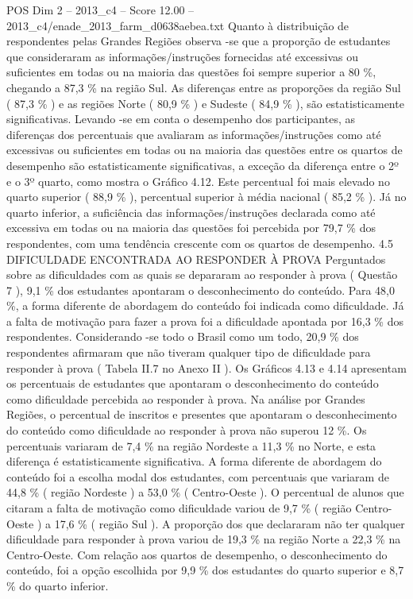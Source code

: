 \begin{textsample}{POS Dim 2 – 2013\_c4 – Score 12.00 – 2013\_c4/enade\_2013\_farm\_d0638aebea.txt}
Quanto à distribuição de respondentes pelas Grandes Regiões observa -se que a proporção de estudantes que consideraram as informações/instruções fornecidas até excessivas ou suficientes em todas ou na maioria das questões foi sempre superior a 80 \%, chegando a 87,3 \% na região Sul.
As diferenças entre as proporções da região Sul ( 87,3 \% ) e as regiões Norte ( 80,9 \% ) e Sudeste ( 84,9 \% ), são estatisticamente significativas.
Levando -se em conta o desempenho dos participantes, as diferenças dos percentuais que avaliaram as informações/instruções como até excessivas ou suficientes em todas ou na maioria das questões entre os quartos de desempenho são estatisticamente significativas, a exceção da diferença entre o 2º e o 3º quarto, como mostra o Gráfico 4.12.
Este percentual foi mais elevado no quarto superior ( 88,9 \% ), percentual superior à média nacional ( 85,2 \% ).
Já no quarto inferior, a suficiência das informações/instruções declarada como até excessiva em todas ou na maioria das questões foi percebida por 79,7 \% dos respondentes, com uma tendência crescente com os quartos de desempenho. 4.5 DIFICULDADE ENCONTRADA AO RESPONDER À PROVA Perguntados sobre as dificuldades com as quais se depararam ao responder à prova ( Questão 7 ), 9,1 \% dos estudantes apontaram o desconhecimento do conteúdo.
Para 48,0 \%, a forma diferente de abordagem do conteúdo foi indicada como dificuldade.
Já a falta de motivação para fazer a prova foi a dificuldade apontada por 16,3 \% dos respondentes.
Considerando -se todo o Brasil como um todo, 20,9 \% dos respondentes afirmaram que não tiveram qualquer tipo de dificuldade para responder à prova ( Tabela II.7 no Anexo II ).
Os Gráficos 4.13 e 4.14 apresentam os percentuais de estudantes que apontaram o desconhecimento do conteúdo como dificuldade percebida ao responder à prova.
Na análise por Grandes Regiões, o percentual de inscritos e presentes que apontaram o desconhecimento do conteúdo como dificuldade ao responder à prova não superou 12 \%.
Os percentuais variaram de 7,4 \% na região Nordeste a 11,3 \% no Norte, e esta diferença é estatisticamente significativa.
A forma diferente de abordagem do conteúdo foi a escolha modal dos estudantes, com percentuais que variaram de 44,8 \% ( região Nordeste ) a 53,0 \% ( Centro-Oeste ).
O percentual de alunos que citaram a falta de motivação como dificuldade variou de 9,7 \% ( região Centro-Oeste ) a 17,6 \% ( região Sul ).
A proporção dos que declararam não ter qualquer dificuldade para responder à prova variou de 19,3 \% na região Norte a 22,3 \% na Centro-Oeste.
Com relação aos quartos de desempenho, o desconhecimento do conteúdo, foi a opção escolhida por 9,9 \% dos estudantes do quarto superior e 8,7 \% do quarto inferior.

\end{textsample}
